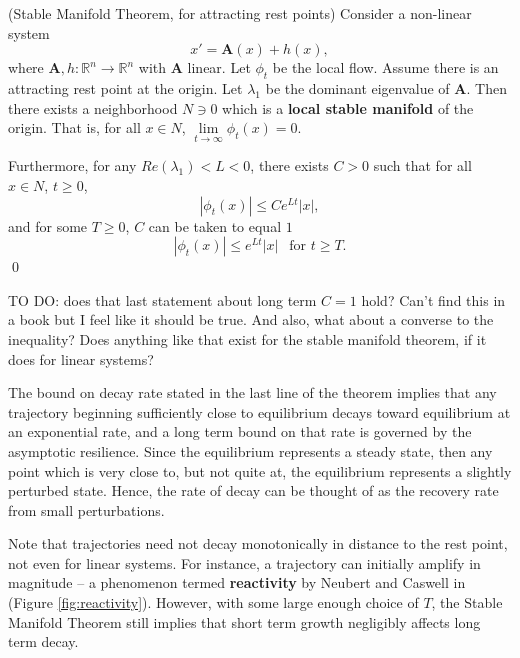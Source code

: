 \begin{theorem}(Stable Manifold Theorem, for attracting rest points)
	Consider a non-linear system 
	$$x' = \mathbf{A}(x) + h(x),$$ 
	where $\mathbf{A}, h: \mathbb{R}^n \to \mathbb{R}^n$ with $\mathbf{A}$ linear.  Let $\phi_t$ be the local flow.
	Assume there is an attracting rest point at the origin. 
	Let $\lambda_1$ be the dominant eigenvalue of $\mathbf{A}$. Then there exists a neighborhood $N \ni 0$ which is a \textbf{local stable manifold} of the origin. 
	That is, for all $x \in N$, $\lim\limits_{t \to \infty} \phi_t(x)= 0$.
	
	Furthermore, for any $Re(\lambda_1) < L < 0$, there exists $C >0$ such that for all $x \in N$, $t \geq 0$,
	$$|\phi_t(x)| \leq Ce^{Lt}|x|,$$
 	and for some $T \geq 0$, $C$ can be taken to equal $1$
	$$|\phi_t(x)| \leq e^{L t}|x| ~ ~\text{ for } t \geq T.$$\qed
\end{theorem}

TO DO: does that last statement about long term $C=1$ hold? Can't find this in a book but I feel like it should be true. And also, what about a converse to the inequality? Does anything like that exist for the stable manifold theorem, if it does for linear systems? 

The bound on decay rate stated in the last line of the theorem implies that any trajectory beginning sufficiently close to equilibrium decays toward equilibrium at an exponential rate, and a long term bound on that rate is governed by the asymptotic resilience. Since the equilibrium represents a steady state, then any point which is very close to, but not quite at, the equilibrium represents a slightly perturbed state. Hence, the rate of decay can be thought of as the recovery rate from small perturbations. 


\begin{remark}
	Note that trajectories need not decay monotonically in distance to the rest point, not even for linear systems. For instance, a trajectory can initially amplify in magnitude -- a phenomenon termed \textbf{reactivity} by Neubert and Caswell in \cite{neubertAlternativesResilienceMeasuring1997a} (Figure \ref{fig:reactivity}). However, with some large enough choice of $T$, the Stable Manifold Theorem still implies that short term growth negligibly affects long term decay. 
\end{remark}

